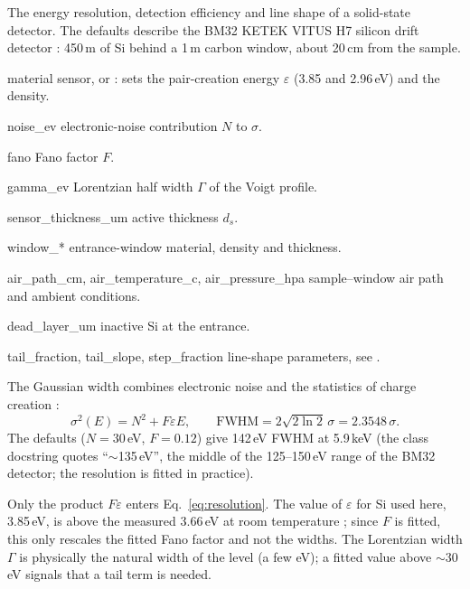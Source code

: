 The energy resolution, detection efficiency and line shape of a solid-state detector. The
defaults describe the BM32 KETEK VITUS H7 silicon drift detector \citep{Lechner1996}: 450\,\textmu m
of Si behind a 1\,\textmu m carbon window, about 20\,cm from the sample.
\begin{args}
\item[material] sensor,  or : sets the pair-creation energy $\varepsilon$
  (3.85 and 2.96\,eV) and the density.
\item[noise\_ev] electronic-noise contribution $N$ to $\sigma$.
\item[fano] Fano factor $F$.
\item[gamma\_ev] Lorentzian half width $\Gamma$ of the Voigt profile.
\item[sensor\_thickness\_um] active thickness $d_s$.
\item[window\_*] entrance-window material, density and thickness.
\item[air\_path\_cm, air\_temperature\_c, air\_pressure\_hpa] sample--window air path and
  ambient conditions.
\item[dead\_layer\_um] inactive Si at the entrance.
\item[tail\_fraction, tail\_slope, step\_fraction] line-shape parameters, see .
\end{args}
 The Gaussian width combines electronic noise and the statistics of charge
creation \citep{Fano1947,Knoll2010}:
\begin{equation}
  \sigma^2(E) = N^2 + F\varepsilon E, \qquad \mathrm{FWHM} = 2\sqrt{2\ln2}\,\sigma =
  2.3548\,\sigma .
  \label{eq:resolution}
\end{equation}
The defaults ($N = 30$\,eV, $F = 0.12$) give 142\,eV FWHM at 5.9\,keV (the class docstring
quotes ``$\sim$135\,eV'', the middle of the 125--150\,eV range of the BM32 detector; the
resolution is fitted in practice).
\begin{hyp}
Only the product $F\varepsilon$ enters Eq.~\eqref{eq:resolution}. The value of $\varepsilon$
for Si used here, 3.85\,eV, is above the measured 3.66\,eV at room temperature
\citep{Scholze1998}; since $F$ is fitted, this only rescales the fitted Fano factor and not
the widths. The Lorentzian width $\Gamma$ is physically the natural width of the level (a few
eV); a fitted value above $\sim$30\,eV signals that a tail term is needed.
\end{hyp}

